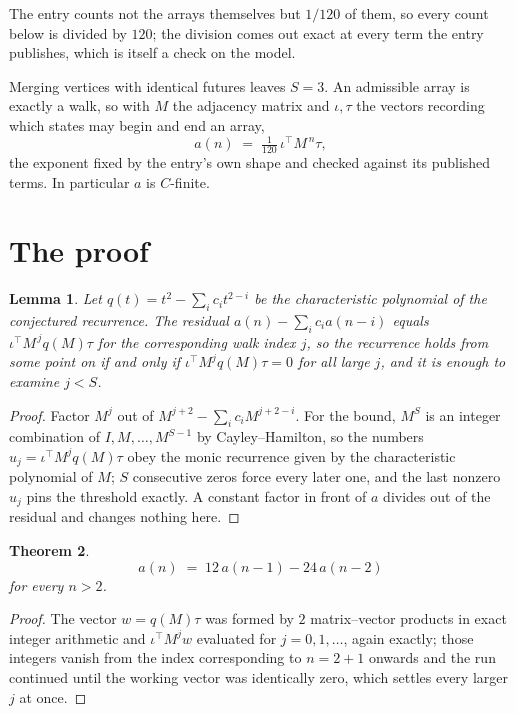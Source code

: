 \documentclass[11pt,a4paper]{article}
\theoremstyle{plain}
\newtheorem{theorem}{Theorem}
\newtheorem{lemma}[theorem]{Lemma}
\theoremstyle{definition}
\begin{document}
The entry counts not the arrays themselves but $1/120$ of them, so every count below is divided by $120$; the division comes out exact at every term the entry publishes, which is itself a check on the model.

Merging vertices with identical futures leaves $S=3$. An admissible array is exactly a walk, so with $M$ the adjacency matrix and $\iota,\tau$ the vectors recording which states may begin and end an array,
\[
a(n)\;=\;\tfrac{1}{120}\,\iota^{\!\top}M^{\,n}\tau ,
\]
the exponent fixed by the entry's own shape and checked against its published terms. In
particular $a$ is $C$-finite.

\section{The proof}

\begin{lemma}\label{lem:crit}
Let $q(t)=t^{2}-\sum_i c_it^{2-i}$ be the characteristic polynomial of the
conjectured recurrence. The residual $a(n)-\sum_ic_ia(n-i)$ equals
$\iota^{\!\top}M^{\,j}q(M)\tau$ for the corresponding walk index $j$, so the recurrence
holds from some point on if and only if $\iota^{\!\top}M^{j}q(M)\tau=0$ for all large $j$,
and it is enough to examine $j<S$.
\end{lemma}

\begin{proof}
Factor $M^{j}$ out of $M^{j+2}-\sum_ic_iM^{j+2-i}$. For the bound, $M^{S}$
is an integer combination of $I,M,\dots,M^{S-1}$ by Cayley--Hamilton, so the numbers
$u_j=\iota^{\!\top}M^{j}q(M)\tau$ obey the monic recurrence given by the characteristic
polynomial of $M$; $S$ consecutive zeros force every later one, and the last nonzero $u_j$
pins the threshold exactly. A constant factor in front of $a$ divides out of the residual and
changes nothing here.
\end{proof}

\begin{theorem}
\[
a(n)\;=\;12\,a(n-1) - 24\,a(n-2)
\]
for every $n>2$.
\end{theorem}

\begin{proof}
The vector $w=q(M)\tau$ was formed by $2$ matrix--vector products in exact integer
arithmetic and $\iota^{\!\top}M^{j}w$ evaluated for $j=0,1,\dots$, again exactly; those
integers vanish from the index corresponding to $n=2+1$ onwards and the run continued
until the working vector was identically zero, which settles every larger $j$ at once.
\end{proof}
\end{document}
